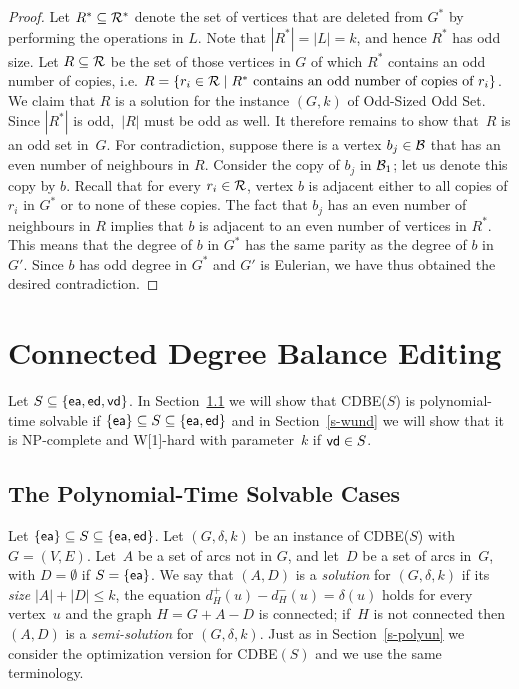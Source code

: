 \documentclass[11pt]{llncs}
\newcommand{\vd}{{\sf vd}}
\newcommand{\ed}{{\sf ed}}
\newcommand{\ea}{{\sf ea}}
\newcommand{\cdbe}{{\sc CDBE}}
\newcommand{\NP}{{\sf NP}}
\newcommand{\W}{{\sf W[1]}}
\begin{document}
\begin{proof}
Let $R^*\subseteq {\cal R}^*$ denote the set of vertices that are deleted from
$G^*$ by performing the operations in $L$. Note that $|R^*|=|L|=k$, and hence
$R^*$ has odd size. Let $R\subseteq {\cal R}$ be the set of those vertices in $G$ of
which $R^*$ contains an odd number of copies, i.e. $R=\{r_i\in {\cal R} \mid
R^* \mbox{ contains an odd number of copies of } r_i\}$. We claim that $R$ is a
solution for the instance $(G,k)$ of {\sc Odd-Sized Odd Set}. Since $|R^*|$ is
odd,~$|R|$ must be odd as well. It therefore remains to show that~$R$ is an odd
set in~$G$. For contradiction, suppose there is a vertex $b_j\in {\cal B}$ that
has an even number of neighbours in $R$. Consider the copy of $b_j$ in ${\cal
B}_1$; let us denote this copy by $b$. Recall that for every $r_i\in {\cal R}$,
vertex $b$ is adjacent either to all copies of $r_i$ in $G^*$ or to none of
these copies. The fact that $b_j$ has an even number of neighbours in $R$ implies
that $b$ is adjacent to an even number of vertices in $R^*$. This means that
the degree of $b$ in $G^*$ has the same parity as the degree of $b$ in~$G'$.
Since $b$ has odd degree in $G^*$ and $G'$ is Eulerian, we have thus obtained
the desired contradiction.
\end{proof}


\section{Connected Degree Balance Editing}\label{sec:directed}

Let $S\subseteq \{\ea,\ed,\vd\}$.  In Section~\ref{s-polyund} 
we will show that
\cdbe($S$) is polynomial-time solvable if $\{\ea\}\subseteq S \subseteq
\{\ea,\ed\}$ and
in Section~\ref{s-wund} we will show 
that it is \NP-complete
and \W-hard with parameter~$k$ if $\vd\in S$.

\subsection{The Polynomial-Time Solvable Cases}\label{s-polyund} 

Let  $\{\ea\}\subseteq S \subseteq \{\ea,\ed\}$.  
Let
$(G,\delta,k)$ be an instance of \cdbe($S$) with $G=(V,E)$. Let~$A$ be a set of
arcs not in $G$, and let~$D$ be a set of arcs in~$G$, with $D=\emptyset$ if
$S=\{\ea\}$.  We say that $(A,D)$ is a {\em solution} for $(G,\delta,k)$ if its
{\em size} $|A|+|D|\leq k$, the equation $d_H^+(u)-d_H^-(u)=\delta(u)$ holds for every vertex~$u$ and
the graph $H=G+A-D$ is connected; if~$H$ is not connected
then $(A,D)$ is a {\em semi-solution} for $(G,\delta,k)$.  Just as in
Section~\ref{s-polyun} 
we consider the optimization version for \cdbe$(S)$ and we use the same terminology.
\end{document}
